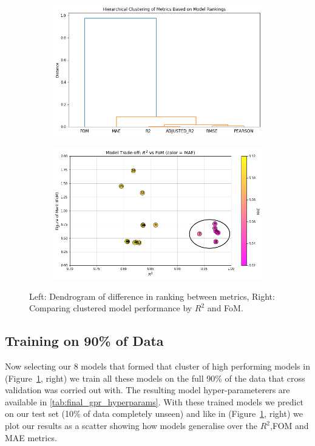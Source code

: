 \documentclass{article}
\begin{document}
\begin{figure}[H]
    \centering
    \begin{subfigure}[t]{0.3\textwidth}
        \centering
        \includegraphics[width=\textwidth]{LatexPlots/CV_plots/clustermetrics.png}
    \end{subfigure}
    \hspace{0.03\textwidth}
    \begin{subfigure}[t]{0.3\textwidth}
        \centering
        \includegraphics[width=\textwidth]{LatexPlots/CV_plots/r2vsfom.png}
    \end{subfigure}
    \caption{Left: Dendrogram of difference in ranking between metrics, Right: Comparing clustered model performance by $R^2$ and FoM.}
    \label{fig:CV_sidebyside}
\end{figure}





\subsection*{Training on 90\% of Data}
Now selecting our 8 models that formed that cluster of high performing models in (Figure~\ref{fig:CV_sidebyside}, right) we train all these models on the full 90\% of the data that cross validation was corried out with.
The resulting model hyper-parameterers are available in \ref{tab:final_gpr_hyperparams}. With these trained models we predict on our test set (10\% of data completely unseen) and like in (Figure~\ref{fig:CV_sidebyside}, right)
we plot our results as a scatter showing how models generalise over the \(R^2\),FOM and MAE metrics.
\end{document}
